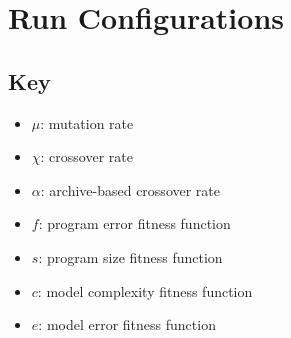 \chapter{Run Configurations}
\label{appendix:configuration_parameters}

\section{Key}
\begin{itemize}[noitemsep]
\item $\mu$: mutation rate
\item $\chi$: crossover rate
\item $\alpha$: archive-based crossover rate
\item $f$: program error fitness function
\item $s$: program size fitness function
\item $c$: model complexity fitness function
\item $e$: model error fitness function
\end{itemize}

